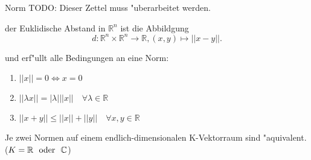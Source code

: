 \documentclass[class=article, crop=false]{standalone}
\begin{document}
\begin{zettel}{Norm}
    TODO: Dieser Zettel muss "uberarbeitet werden.
\begin{flashcard}
    \begin{definition}
        der Euklidische Abstand in $\mathbb{R}^n $ ist die Abbildgung
        \[
            d: \mathbb{R}^n \times \mathbb{R}^n \longrightarrow  \mathbb{R}, (x,y) \mapsto ||x-y||
        .\]
    \end{definition}
    und erf"ullt alle Bedingungen an eine Norm:
    \begin{enumerate}
        \item $ ||x|| = 0 \iff x = 0$ 
        \item $ ||\lambda x|| = |\lambda| ||x|| \quad \forall \lambda \in  \mathbb{R}$ 
        \item $ ||x + y|| \leq  ||x|| + ||y|| \quad \forall x,y \in \mathbb{R}$ 
    \end{enumerate}

\end{flashcard}
\begin{theorem}
    Je zwei Normen auf einem endlich-dimensionalen K-Vektorraum sind "aquivalent. ($K=\R \tx{ oder } \mathbb{C}$)
\end{theorem}

\end{zettel}
\end{document}
